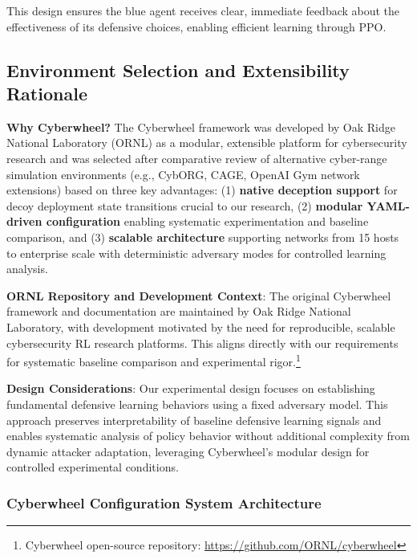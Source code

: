 \documentclass[12pt,oneside]{article}
\begin{document}
This design ensures the blue agent receives clear, immediate feedback about the effectiveness of its defensive choices, enabling efficient learning through PPO.


\subsection{Environment Selection and Extensibility Rationale}

\textbf{Why Cyberwheel?} The Cyberwheel framework was developed by Oak Ridge National Laboratory (ORNL) as a modular, extensible platform for cybersecurity research and was selected after comparative review of alternative cyber-range simulation environments (e.g., CybORG, CAGE, OpenAI Gym network extensions) based on three key advantages: (1) \textbf{native deception support} for decoy deployment state transitions crucial to our research, (2) \textbf{modular YAML-driven configuration} enabling systematic experimentation and baseline comparison, and (3) \textbf{scalable architecture} supporting networks from 15 hosts to enterprise scale with deterministic adversary modes for controlled learning analysis.

\textbf{ORNL Repository and Development Context}: The original Cyberwheel framework and documentation are maintained by Oak Ridge National Laboratory, with development motivated by the need for reproducible, scalable cybersecurity RL research platforms. This aligns directly with our requirements for systematic baseline comparison and experimental rigor.\footnote{Cyberwheel open-source repository: \url{https://github.com/ORNL/cyberwheel}}

\textbf{Design Considerations}: Our experimental design focuses on establishing fundamental defensive learning behaviors using a fixed adversary model. This approach preserves interpretability of baseline defensive learning signals and enables systematic analysis of policy behavior without additional complexity from dynamic attacker adaptation, leveraging Cyberwheel's modular design for controlled experimental conditions.

\subsubsection{Cyberwheel Configuration System Architecture}
\end{document}

